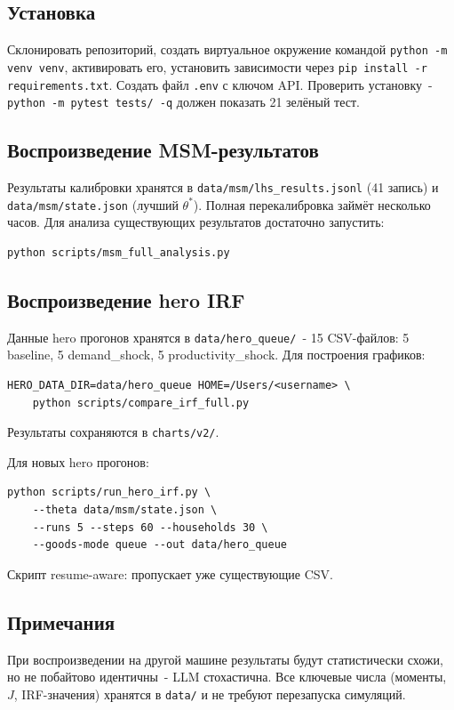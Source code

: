 \documentclass[12pt, a4paper]{article}
\begin{document}
\subsection{Установка}

Склонировать репозиторий, создать виртуальное окружение командой \texttt{python -m venv venv}, активировать его, установить зависимости через \texttt{pip install -r requirements.txt}. Создать файл \texttt{.env} с ключом API. Проверить установку~- \texttt{python -m pytest tests/ -q} должен показать 21 зелёный тест.

\subsection{Воспроизведение MSM-результатов}

Результаты калибровки хранятся в \texttt{data/msm/lhs\_results.jsonl} (41 запись) и \texttt{data/msm/state.json} (лучший $\theta^*$). Полная перекалибровка займёт несколько часов. Для анализа существующих результатов достаточно запустить:
\begin{verbatim}
python scripts/msm_full_analysis.py
\end{verbatim}

\subsection{Воспроизведение hero IRF}

Данные hero прогонов хранятся в \texttt{data/hero\_queue/}~- 15 CSV-файлов: 5 baseline, 5 demand\_shock, 5 productivity\_shock. Для построения графиков:
\begin{verbatim}
HERO_DATA_DIR=data/hero_queue HOME=/Users/<username> \
    python scripts/compare_irf_full.py
\end{verbatim}
Результаты сохраняются в \texttt{charts/v2/}.

Для новых hero прогонов:
\begin{verbatim}
python scripts/run_hero_irf.py \
    --theta data/msm/state.json \
    --runs 5 --steps 60 --households 30 \
    --goods-mode queue --out data/hero_queue
\end{verbatim}
Скрипт resume-aware: пропускает уже существующие CSV.


\subsection{Примечания}

При воспроизведении на другой машине результаты будут статистически схожи, но не побайтово идентичны~- LLM стохастична. Все ключевые числа (моменты, $J$, IRF-значения) хранятся в \texttt{data/} и не требуют перезапуска симуляций.
\end{document}

